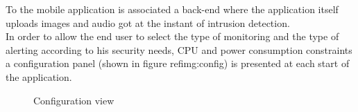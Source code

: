 \documentclass[conference]{IEEEtran}
\begin{document}
To the mobile application is associated a back-end where the application itself uploads images and audio got at the instant of intrusion detection.\\

In order to allow the end user to select the type of monitoring and the type of alerting according to his security needs, CPU and power consumption constraints a configuration panel (shown in figure ref{img:config}) is presented at each start of the application.\\

\begin{figure}[!ht]
\begin{center}
\caption{Configuration view}
\label{img:config}
\end{center}
\end{figure}
\end{document}
